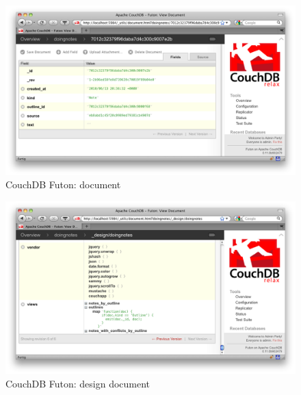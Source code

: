 \begin{figure}[H] 
  \begin{center}
    \includegraphics[width=\textwidth]{grafik/futon-document} 
  \end{center}
  \caption{CouchDB Futon: document}
  \label{fig:futon-document} 
\end{figure}

\medskip
\begin{figure}[H] 
  \begin{center}
    \includegraphics[width=\textwidth]{grafik/futon-design-document} 
  \end{center}
  \caption{CouchDB Futon: design document}
  \label{fig:futon-design} 
\end{figure}
